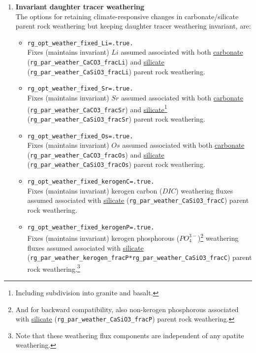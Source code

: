 \begin{enumerate}[noitemsep]
\vspace{2mm}
\item \textbf{Invariant daughter tracer weathering}
\\The options for retaining climate-responsive changes in carbonate/silicate parent rock weathering but keeping daughter tracer weathering invariant, are:
\vspace{1mm}
\begin{itemize}[noitemsep]
\item \texttt{rg\_opt\_weather\_fixed\_Li=.true.}
\\Fixes (maintains invariant) \(Li\) assumed associated with both \uline{carbonate} \\(\texttt{rg\_par\_weather\_CaCO3\_fracLi}) and \uline{silicate} (\texttt{rg\_par\_weather\_CaSiO3\_fracLi}) parent rock weathering.
\item \texttt{rg\_opt\_weather\_fixed\_Sr=.true.}
\\Fixes (maintains invariant) \(Sr\) assumed associated with both \uline{carbonate} \\(\texttt{rg\_par\_weather\_CaCO3\_fracSr}) and \uline{silicate}\footnote{Including subdivision into granite and basalt.}  (\texttt{rg\_par\_weather\_CaSiO3\_fracSr}) parent rock weathering.
\item \texttt{rg\_opt\_weather\_fixed\_Os=.true.}
\\Fixes (maintains invariant) \(Os\) assumed associated with both \uline{carbonate} \\(\texttt{rg\_par\_weather\_CaCO3\_fracOs}) and \uline{silicate} (\texttt{rg\_par\_weather\_CaSiO3\_fracOs}) parent rock weathering.
\newpage
\item \texttt{rg\_opt\_weather\_fixed\_kerogenC=.true.}
\\Fixes (maintains invariant) kerogen carbon (\(DIC\)) weathering fluxes assumed associated with \uline{silicate} (\texttt{rg\_par\_weather\_CaSiO3\_fracC}) parent rock weathering.
\item \texttt{rg\_opt\_weather\_fixed\_kerogenP=.true.}
\\Fixes (maintains invariant) kerogen phosphorous (\(PO^{3-}_{4}\))\footnote{And for backward compatibility, also non-kerogen phosphorous associated with \uline{silicate} (\texttt{rg\_par\_weather\_CaSiO3\_fracP}) parent rock weathering.} weathering fluxes assumed associated with \uline{silicate} (\texttt{rg\_par\_weather\_kerogen\_fracP*rg\_par\_weather\_CaSiO3\_fracC}) parent rock weathering.\footnote{Note that these weathering flux components are independent of any apatite weathering.}

\end{itemize}
\end{enumerate}
